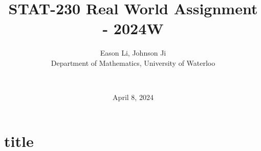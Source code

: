\documentclass[final]{beamer}
\title{STAT-230 Real World Assignment - 2024W}
\author{
    Eason Li, Johnson Ji \\
    Department of Mathematics, University of Waterloo \and \\
}
\date{April 8, 2024} %
\begin{document}
\maketitle

\section*{title}
\end{document}
